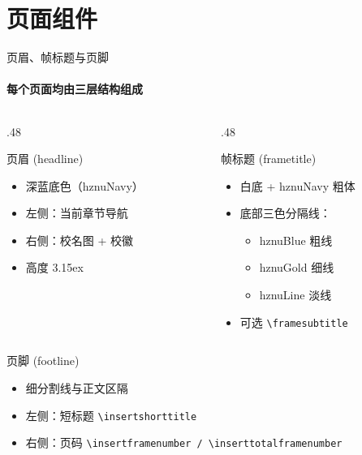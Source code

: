 \documentclass[10pt,aspectratio=169]{beamer}
\begin{document}
\section{页面组件}
\begin{frame}{页眉、帧标题与页脚}
  \framesubtitle{每个页面均由三层结构组成}

  \begin{columns}[T]
    \begin{column}{.48\textwidth}
      \begin{block}{页眉 (headline)}
        \begin{itemize}
          \item 深蓝底色（hznuNavy）
          \item 左侧：当前章节导航
          \item 右侧：校名图 + 校徽
          \item 高度 3.15ex
        \end{itemize}
      \end{block}
    \end{column}
    \begin{column}{.48\textwidth}
      \begin{block}{帧标题 (frametitle)}
        \begin{itemize}
          \item 白底 + hznuNavy 粗体
          \item 底部三色分隔线：
          \begin{itemize}
            \item hznuBlue 粗线
            \item hznuGold 细线
            \item hznuLine 淡线
          \end{itemize}
          \item 可选 \texttt{\textbackslash framesubtitle}
        \end{itemize}
      \end{block}
    \end{column}
  \end{columns}

  \vspace{.2cm}
  \begin{block}{页脚 (footline)}
    \begin{itemize}
      \item 细分割线与正文区隔
      \item 左侧：短标题 \texttt{\textbackslash insertshorttitle}
      \item 右侧：页码 \texttt{\textbackslash insertframenumber / \textbackslash inserttotalframenumber}
    \end{itemize}
  \end{block}

  
\end{frame}
\end{document}
